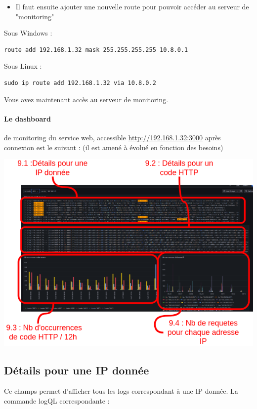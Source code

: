 \documentclass[french, 12pt]{article}%
\newcommand{\itemE}{\item[$\bullet$]}
\begin{document}
\begin{itemize}
\itemE Il faut ensuite ajouter une nouvelle route pour pouvoir accéder au serveur de "monitoring"
\end{itemize}

Sous Windows :
\begin{lstlisting}[style=commandeW]
route add 192.168.1.32 mask 255.255.255.255 10.8.0.1
\end{lstlisting}

Sous Linux :
\begin{lstlisting}[style=commande]
sudo ip route add 192.168.1.32 via 10.8.0.2
\end{lstlisting}


Vous avez maintenant accès au serveur de monitoring.



\paragraph{Le dashboard} de monitoring du service web, accessible \url{http://192.168.1.32:3000} après connexion est le suivant : (il est amené à évolué en fonction des besoins)

\begin{center}
\includegraphics[scale=0.7]{./ressource/exempleRelle.drawio.png}
\end{center}

\subsection{Détails pour une IP donnée}
Ce champs permet d'afficher tous les logs correspondant à une IP donnée. La commande logQL correspondante : 
\end{document}
